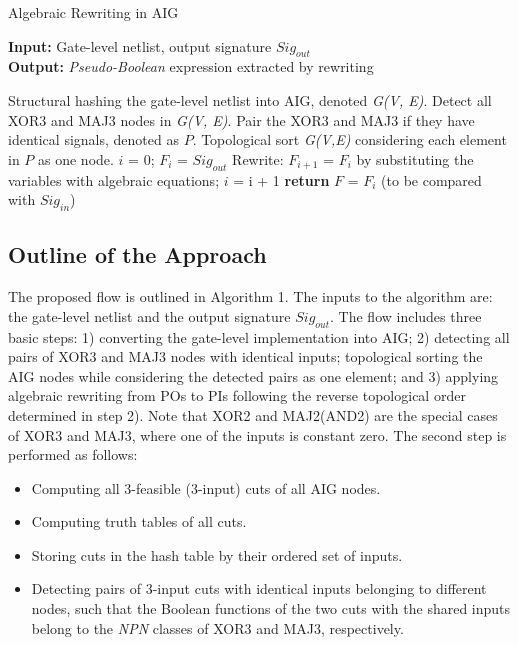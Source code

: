 \begin{algorithm}
\scriptsize
\caption{Algebraic Rewriting in AIG}\label{alg:algorithm}
\textbf{Input:} Gate-level netlist, output signature $Sig_{out}$  \\
\textbf{Output:} \textit{Pseudo-Boolean} expression extracted by rewriting 
\begin{algorithmic}[1]
\State Structural hashing the gate-level netlist into AIG, denoted \textit{G(V, E)}.
\State Detect all XOR3 and MAJ3 nodes in \textit{G(V, E)}.
\State Pair the XOR3 and MAJ3 if they have identical signals, denoted as $P$.
\State Topological sort \textit{G(V,E)} considering each element in $P$ as one node.
\State $i$ = 0; $F_{i}$ = $Sig_{out}$
\State Rewrite: $F_{i+1}$ = $F_{i}$ by substituting the variables with algebraic equations;
\State $i$ = i + 1
\EndWhile
\State \textbf{return} $F$ = $F_{i}$ (to be compared with $Sig_{in}$)
\end{algorithmic}
\end{algorithm}


\subsection{Outline of the Approach}

The proposed flow is outlined in Algorithm 1. The inputs to the algorithm are: the gate-level netlist and the output signature $Sig_{out}$. The flow includes three basic steps: 1) converting the gate-level implementation into AIG; 2) detecting all pairs of XOR3 and MAJ3 nodes with identical inputs; topological sorting the AIG nodes while considering the detected pairs as one element; and 3) applying algebraic rewriting from POs to PIs following the {\color{red}reverse topological order} determined in step 2). Note that XOR2 and MAJ2(AND2) are the special cases of XOR3 and MAJ3, where one of the inputs is constant zero. The second step is performed as follows: 

\begin{itemize}

\item Computing all 3-feasible (3-input) cuts of all AIG nodes.

\item Computing truth tables of all cuts.

\item Storing cuts in the hash table by their ordered set of inputs.

\item Detecting pairs of 3-input cuts with identical inputs belonging to different nodes, such that the Boolean functions of the two cuts with the shared inputs belong to the \textit{NPN} classes of XOR3 and MAJ3, respectively.

\end{itemize}

